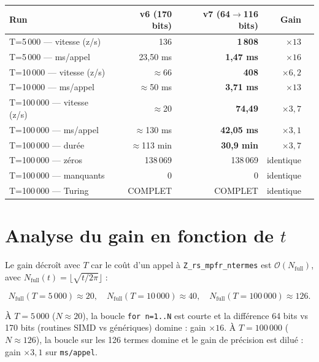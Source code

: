 \documentclass[11pt,a4paper]{article}
\begin{document}
\begin{center}
\begin{tabular}{lrrrr}
\toprule
Run & v6 (170 bits) & v7 (64$\to$116 bits) & Gain \\
\midrule
T=5\,000 --- vitesse (z/s)    & 136       & \textbf{1\,808}    & $\times 13$ \\
T=5\,000 --- ms/appel         & 23,50 ms  & \textbf{1,47 ms}   & $\times 16$ \\
T=10\,000 --- vitesse (z/s)   & $\approx$66 & \textbf{408}     & $\times 6{,}2$ \\
T=10\,000 --- ms/appel        & $\approx$50 ms & \textbf{3,71 ms} & $\times 13$ \\
T=100\,000 --- vitesse (z/s)  & $\approx$20 & \textbf{74,49}  & $\times 3{,}7$ \\
T=100\,000 --- ms/appel       & $\approx$130 ms & \textbf{42,05 ms} & $\times 3{,}1$ \\
T=100\,000 --- durée          & $\approx$113 min & \textbf{30,9 min} & $\times 3{,}7$ \\
\midrule
T=100\,000 --- zéros          & 138\,069  & 138\,069           & identique \\
T=100\,000 --- manquants      & 0         & 0                  & identique \\
T=100\,000 --- Turing         & COMPLET   & COMPLET            & identique \\
\bottomrule
\end{tabular}
\end{center}

\section{Analyse du gain en fonction de $t$}

Le gain décroît avec $T$ car le coût d'un appel à \texttt{Z\_rs\_mpfr\_ntermes}
est $\mathcal{O}(N_\text{full})$, avec $N_\text{full}(t) = \lfloor\sqrt{t/2\pi}\rfloor$ :

\begin{equation}
  N_\text{full}(T = 5\,000)   \approx 20, \quad
  N_\text{full}(T = 10\,000)  \approx 40, \quad
  N_\text{full}(T = 100\,000) \approx 126.
\end{equation}

À $T = 5\,000$ ($N \approx 20$), la boucle \texttt{for n=1..N} est courte et la
différence 64 bits vs 170 bits (routines SIMD vs génériques) domine : gain $\times 16$.
À $T = 100\,000$ ($N \approx 126$), la boucle sur les 126 termes domine et le gain
de précision est dilué : gain $\times 3,1$ sur \texttt{ms/appel}.
\end{document}
